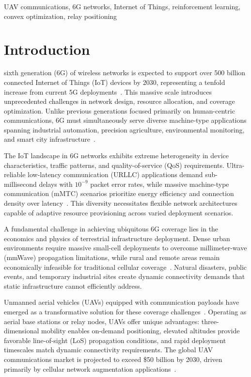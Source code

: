 \documentclass[journal]{IEEEtran}
\begin{document}
\begin{IEEEkeywords}
UAV communications, 6G networks, Internet of Things, reinforcement learning, convex optimization, relay positioning
\end{IEEEkeywords}

\section{Introduction}

 sixth generation (6G) of wireless networks is expected to support over 500 billion connected Internet of Things (IoT) devices by 2030, representing a tenfold increase from current 5G deployments~\cite{saad2020}. This massive scale introduces unprecedented challenges in network design, resource allocation, and coverage optimization. Unlike previous generations focused primarily on human-centric communications, 6G must simultaneously serve diverse machine-type applications spanning industrial automation, precision agriculture, environmental monitoring, and smart city infrastructure~\cite{letaief2021}.

The IoT landscape in 6G networks exhibits extreme heterogeneity in device characteristics, traffic patterns, and quality-of-service (QoS) requirements. Ultra-reliable low-latency communication (URLLC) applications demand sub-millisecond delays with $10^{-9}$ packet error rates, while massive machine-type communication (mMTC) scenarios prioritize energy efficiency and connection density over latency~\cite{tariq2020}. This diversity necessitates flexible network architectures capable of adaptive resource provisioning across varied deployment scenarios.

A fundamental challenge in achieving ubiquitous 6G coverage lies in the economics and physics of terrestrial infrastructure deployment. Dense urban environments require massive small-cell deployments to overcome millimeter-wave (mmWave) propagation limitations, while rural and remote areas remain economically infeasible for traditional cellular coverage~\cite{wang2023}. Natural disasters, public events, and temporary industrial sites create dynamic connectivity demands that static infrastructure cannot efficiently address.

Unmanned aerial vehicles (UAVs) equipped with communication payloads have emerged as a transformative solution for these coverage challenges~\cite{zeng2016, mozaffari2019}. Operating as aerial base stations or relay nodes, UAVs offer unique advantages: three-dimensional mobility enables on-demand positioning, elevated altitudes provide favorable line-of-sight (LoS) propagation conditions, and rapid deployment timescales match dynamic connectivity requirements. The global UAV communications market is projected to exceed \$50 billion by 2030, driven primarily by cellular network augmentation applications~\cite{geraci2022}.
\end{document}

